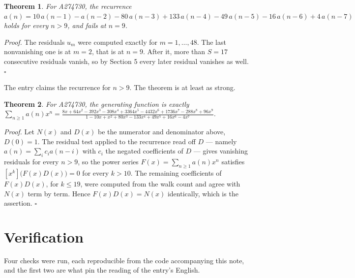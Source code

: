 \documentclass[11pt]{article}
\newtheorem{theorem}{Theorem}
\theoremstyle{definition}
\begin{document}
\begin{theorem} For A274730, the recurrence $a(n) = 10\,a(n-1) - a(n-2) - 80\,a(n-3) + 133\,a(n-4) - 49\,a(n-5) - 16\,a(n-6) + 4\,a(n-7)$ holds for every $n > 9$, and fails at $n = 9$.\end{theorem}

{\itshape Proof.} The residuals $u_m$ were computed exactly for $m = 1,\dots,48$. The last nonvanishing one is at $m = 2$, that is at $n = 9$. After it, more than $S = 17$ consecutive residuals vanish, so by Section 5 every later residual vanishes as well. $\square$

The entry claims the recurrence for $n > 9$. The theorem is at least as strong.

\begin{theorem} For A274730, the generating function is exactly $\sum_{n\ge 1} a(n)x^n = \frac{8x + 64x^{2} - 392x^{3} - 308x^{4} + 3364x^{5} - 4432x^{6} + 1736x^{7} - 288x^{8} + 96x^{9}}{1 - 10x + x^{2} + 80x^{3} - 133x^{4} + 49x^{5} + 16x^{6} - 4x^{7}}$.\end{theorem}

{\itshape Proof.} Let $N(x)$ and $D(x)$ be the numerator and denominator above, $D(0)=1$. The residual test applied to the recurrence read off $D$ --- namely $a(n) = \sum_i c_i a(n-i)$ with $c_i$ the negated coefficients of $D$ --- gives vanishing residuals for every $n > 9$, so the power series $F(x)=\sum_{n\ge 1}a(n)x^n$ satisfies $[x^k]\bigl(F(x)D(x)\bigr) = 0$ for every $k > 10$. The remaining coefficients of $F(x)D(x)$, for $k \le 19$, were computed from the walk count and agree with $N(x)$ term by term. Hence $F(x)D(x) = N(x)$ identically, which is the assertion. $\square$

\section{Verification}

Four checks were run, each reproducible from the code accompanying this note, and the first two are what pin the reading of the entry's English.
\end{document}
